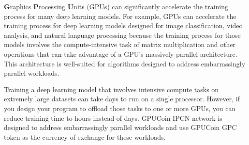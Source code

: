 \textbf{G}raphics \textbf{P}rocessing \textbf{U}nits (GPUs) can significantly accelerate the training process for many deep learning models. For example, GPUs can accelerate the training process for deep learning models designed for image classification, video analysis, and natural language processing because the training process for those models involves the compute-intensive task of matrix multiplication and other operations that can take advantage of a GPU's massively parallel architecture. This architecture is well-suited for algorithms designed to address embarrassingly parallel workloads.

Training a deep learning model that involves intensive compute tasks on extremely large datasets can take days to run on a single processor. However, if you design your program to offload those tasks to one or more GPUs, you can reduce training time to hours instead of days. GPUCoin IPCN network is designed to address embarrassingly parallel workloads and use GPUCoin GPC token as the currency of exchange for these workloads.


